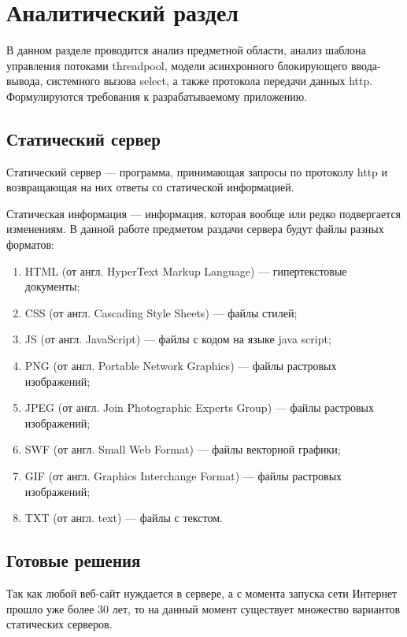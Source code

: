 \chapter{Аналитический раздел}

В данном разделе проводится анализ предметной области, анализ шаблона управления потоками threadpool, модели асинхронного блокирующего ввода-вывода, системного вызова select, а также протокола передачи данных http. Формулируются требования к разрабатываемому приложению.

\section{Статический сервер}

Статический сервер --- программа, принимающая запросы по протоколу http и возвращающая на них ответы со статической информацией.

Статическая информация --- информация, которая вообще или редко подвергается изменениям. В данной работе предметом раздачи сервера будут файлы разных форматов:
\begin{enumerate}
	\item HTML (от англ. HyperText Markup Language) --- гипертекстовые документы;
	\item CSS (от англ. Cascading Style Sheets) --- файлы стилей;
	\item JS (от англ. JavaScript) --- файлы с кодом на языке java script;
	\item PNG (от англ. Portable Network Graphics) --- файлы растровых изображений;
	\item JPEG (от англ. Join Photographic Experts Group) --- файлы растровых изображений;
	\item SWF (от англ. Small Web Format) --- файлы векторной графики;
	\item GIF (от англ. Graphics Interchange Format) --- файлы растровых изображений;
	\item TXT (от англ. text) --- файлы с текстом.
\end{enumerate}

\section{Готовые решения}

Так как любой веб-сайт нуждается в сервере, а с момента запуска сети Интернет прошло уже более 30 лет, то на данный момент существует множество вариантов статических серверов.

